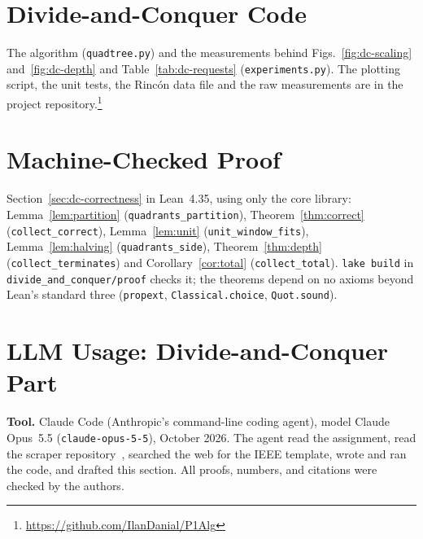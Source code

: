 
\section{Divide-and-Conquer Code}
\label{app:dc-code}

The algorithm (\texttt{quadtree.py}) and the measurements behind
Figs.~\ref{fig:dc-scaling} and~\ref{fig:dc-depth} and Table~\ref{tab:dc-requests}
(\texttt{experiments.py}). The plotting script, the unit tests, the Rinc\'on
data file and the raw measurements are in the project
repository.\footnote{\url{https://github.com/IlanDanial/P1Alg}}




\section{Machine-Checked Proof}
\label{app:dc-lean}

Section~\ref{sec:dc-correctness} in Lean~4.35, using only the core library:
Lemma~\ref{lem:partition} (\texttt{quadrants\_partition}),
Theorem~\ref{thm:correct} (\texttt{collect\_correct}),
Lemma~\ref{lem:unit} (\texttt{unit\_window\_fits}),
Lemma~\ref{lem:halving} (\texttt{quadrants\_side}),
Theorem~\ref{thm:depth} (\texttt{collect\_terminates}) and
Corollary~\ref{cor:total} (\texttt{collect\_total}).
\texttt{lake build} in \texttt{divide\_and\_conquer/proof} checks it; the
theorems depend on no axioms beyond Lean's standard three
(\texttt{propext}, \texttt{Classical.choice}, \texttt{Quot.sound}).



\section{LLM Usage: Divide-and-Conquer Part}
\label{app:dc-llm}

\textbf{Tool.} Claude Code (Anthropic's command-line coding agent), model
Claude Opus~5.5 (\texttt{claude-opus-5-5}), October 2026. The agent read the
assignment, read the scraper repository~\cite{danial2023airbnb}, searched the web
for the IEEE template, wrote and ran the code, and drafted this section. All
proofs, numbers, and citations were checked by the authors.

